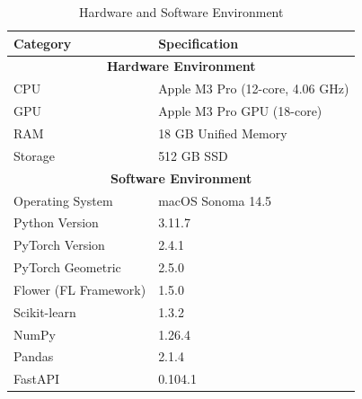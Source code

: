 \begin{table}[htbp]
\centering
\small
\caption{Hardware and Software Environment}
\label{tab:hardware_software}
\begin{tabular}{ll}
\toprule
\textbf{Category} & \textbf{Specification} \\
\midrule
\multicolumn{2}{c}{\textbf{Hardware Environment}} \\
\midrule
CPU & Apple M3 Pro (12-core, 4.06 GHz) \\
GPU & Apple M3 Pro GPU (18-core) \\
RAM & 18 GB Unified Memory \\
Storage & 512 GB SSD \\
\midrule
\multicolumn{2}{c}{\textbf{Software Environment}} \\
\midrule
Operating System & macOS Sonoma 14.5 \\
Python Version & 3.11.7 \\
PyTorch Version & 2.4.1 \\
PyTorch Geometric & 2.5.0 \\
Flower (FL Framework) & 1.5.0 \\
Scikit-learn & 1.3.2 \\
NumPy & 1.26.4 \\
Pandas & 2.1.4 \\
FastAPI & 0.104.1 \\
\bottomrule
\end{tabular}
\end{table}

